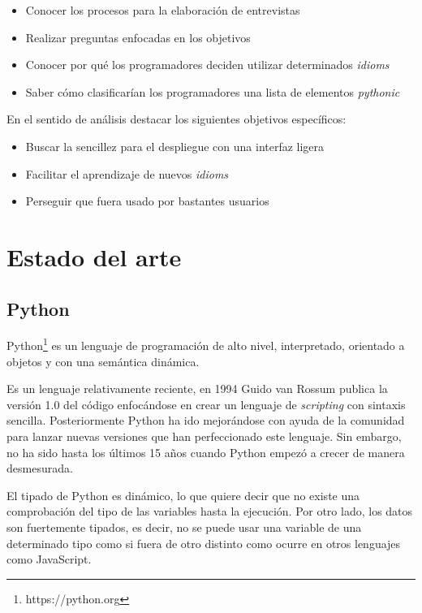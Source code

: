 \documentclass[a4paper, 12pt]{book}
\begin{document}
\begin{itemize}
    \item Conocer los procesos para la elaboración de entrevistas
    \item Realizar preguntas enfocadas en los objetivos
    \item Conocer por qué los programadores deciden utilizar determinados \textit{idioms}
    \item Saber cómo clasificarían los programadores una lista de elementos \textit{pythonic}
\end{itemize}

En el sentido de análisis destacar los siguientes objetivos específicos:
\begin{itemize}
    \item Buscar la sencillez para el despliegue con una interfaz ligera
    \item Facilitar el aprendizaje de nuevos \textit{idioms}
    \item Perseguir que fuera usado por bastantes usuarios
\end{itemize}

   

\cleardoublepage
\chapter{Estado del arte}
\label{chap:arte}
\section{Python}

Python\footnote{https://python.org} es un lenguaje de programación de alto nivel, interpretado, orientado a objetos y con una semántica dinámica.

Es un lenguaje relativamente reciente, en 1994 Guido van Rossum publica la versión 1.0 del código enfocándose en crear un lenguaje de \textit{scripting} con sintaxis sencilla. Posteriormente Python ha ido mejorándose con ayuda de la comunidad para lanzar nuevas versiones que han perfeccionado este lenguaje. Sin embargo, no ha sido hasta los últimos 15 años cuando Python empezó a crecer de manera desmesurada.

El tipado de Python es dinámico, lo que quiere decir que no existe una comprobación del tipo de las variables hasta la ejecución. Por otro lado, los datos son fuertemente tipados, es decir, no se puede usar una variable de una determinado tipo como si fuera de otro distinto como ocurre en otros lenguajes como JavaScript.
\end{document}
